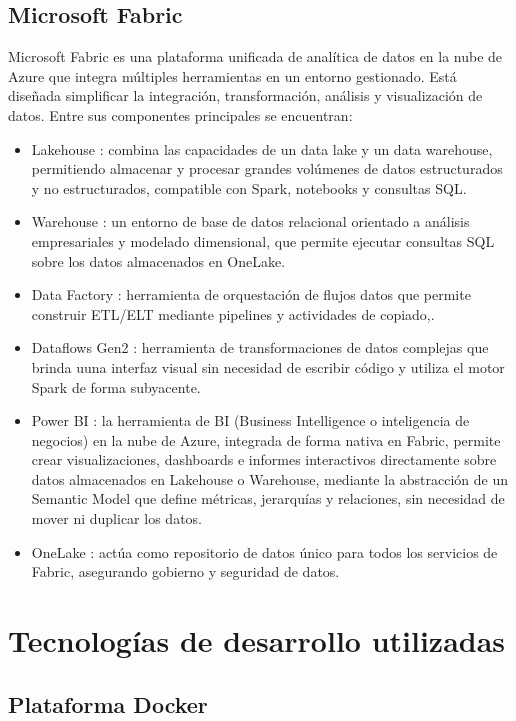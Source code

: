 \subsection{Microsoft Fabric}
Microsoft Fabric es una plataforma unificada de analítica de datos en la nube de Azure que integra múltiples herramientas en un entorno gestionado. Está diseñada simplificar la integración, transformación, análisis y visualización de datos. Entre sus componentes principales se encuentran: 

\begin{itemize}
	\item Lakehouse \cite{link}: combina las capacidades de un data lake y un data warehouse, permitiendo almacenar y procesar grandes volúmenes de datos estructurados y no estructurados, compatible con Spark, notebooks y consultas SQL.
	\item Warehouse \cite{link}: un entorno de base de datos relacional orientado a análisis empresariales y modelado dimensional, que permite ejecutar consultas SQL sobre los datos almacenados en OneLake.
	\item Data Factory \cite{link}: herramienta de orquestación de flujos datos que permite construir ETL/ELT mediante pipelines y actividades de copiado,.
	\item Dataflows Gen2 \cite{link}: herramienta de transformaciones de datos complejas que brinda uuna interfaz visual sin necesidad de escribir código y utiliza el motor Spark de forma subyacente.
	\item Power BI \cite{link}: la herramienta de BI (Business Intelligence o inteligencia de negocios) en la nube de Azure, integrada de forma nativa en Fabric, permite crear visualizaciones, dashboards e informes interactivos directamente sobre datos almacenados en Lakehouse o Warehouse, mediante la abstracción de un Semantic Model que define métricas, jerarquías y relaciones, sin necesidad de mover ni duplicar los datos.
	\item OneLake \cite{link}: actúa como repositorio de datos único para todos los servicios de Fabric, asegurando gobierno y seguridad de datos. 
\end{itemize}



\section{Tecnologías de desarrollo utilizadas}


\subsection{Plataforma Docker}

